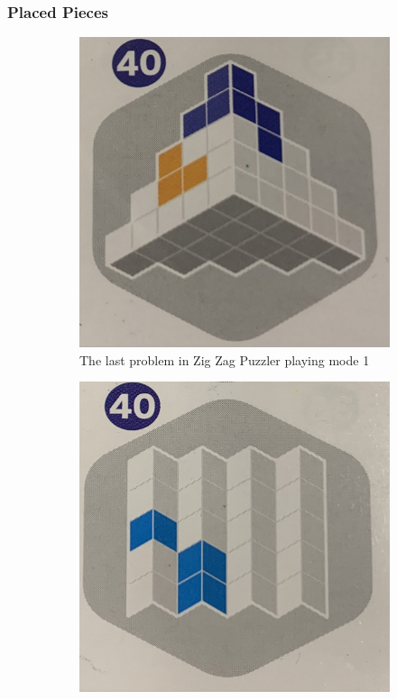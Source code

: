 \subsubsection{Placed Pieces}
\begin{figure}[htbp]
    \centering
    \begin{subfigure}[b]{.45\textwidth}
    \centering
    \includegraphics[width=\textwidth]{figs/mode1.jpg}
    \caption{The last problem in Zig Zag Puzzler playing mode 1}
    \label{fig:game2mode1}
    \end{subfigure}
     \begin{subfigure}[b]{.45\textwidth}
     \centering
      \includegraphics[width=\textwidth]{figs/mode2.jpg}

\end{subfigure}
\end{figure}
